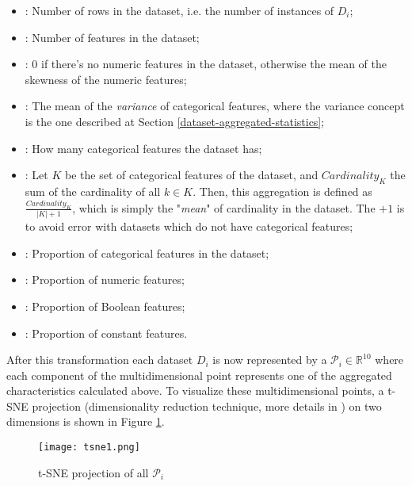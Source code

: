 \begin{itemize}
    \item \textbf{}: Number of rows in the dataset, i.e. the number of instances of $D_i$;
    \item \textbf{}: Number of features in the dataset;
    \item \textbf{}: $0$ if there's no numeric features in the dataset, otherwise the mean of the skewness of the numeric features;
    \item \textbf{}: The mean of the \textit{variance} of categorical features, where the variance concept is the one described at Section \ref{dataset-aggregated-statistics};
    \item \textbf{}: How many categorical features the dataset has;
    \item \textbf{}: Let $K$ be the set of categorical features of the dataset, and $Cardinality_K$ the sum of the cardinality of all $k\in K$. Then, this aggregation is defined as $\frac{Cardinality_K}{|K| + 1}$, which is simply the "\textit{mean}" of cardinality in the dataset. The $+1$ is to avoid error with datasets which do not have categorical features;
    \item \textbf{}: Proportion of categorical features in the dataset;
    \item \textbf{}: Proportion of numeric features;
    \item \textbf{}: Proportion of Boolean features;
    \item \textbf{}: Proportion of constant features.
\end{itemize}


After this transformation each dataset $D_i$ is now represented by a $\mathcal{P}_i \in \mathbb{R}^{10}$ where each component of the multidimensional point represents one of the aggregated characteristics calculated above. To visualize these multidimensional points, a t-SNE projection (dimensionality reduction technique, more details in \cite{maaten2008visualizing}) on two dimensions is shown in Figure \ref{fig:tsne-1}.

\begin{figure}[!h]
    \centering
    \texttt{[image: tsne1.png]}
    \caption{t-SNE projection of all $\mathcal{P}_i$}
    \label{fig:tsne-1}
\end{figure}

